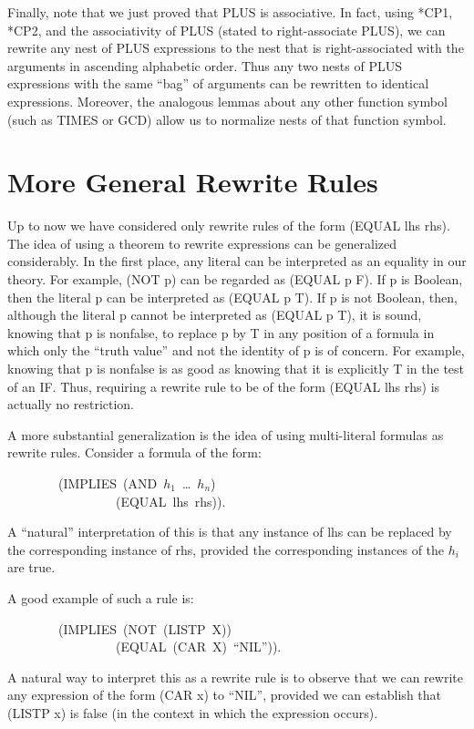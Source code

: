 \documentclass[10pt]{book}
\newenvironment{pubasis}{\begin{flushleft}}{\end{flushleft}}
\begin{document}
Finally, note that we just proved that PLUS is associative.
In fact, using
*CP1, *CP2, and the
associativity of PLUS (stated  to right-associate PLUS), we can rewrite  any nest of PLUS
expressions  to the nest that is right-associated
with the arguments in ascending alphabetic order.  Thus
any two nests of PLUS expressions with the same ``bag'' of arguments
can be rewritten to identical expressions.  Moreover,
the analogous lemmas about any other function symbol
(such as TIMES or GCD) allow us to normalize nests of that function symbol.

\section{More General Rewrite Rules}
Up to now we have  considered only rewrite rules of the form
(EQUAL lhs rhs).  The idea of using a theorem to rewrite expressions can be
generalized considerably.  In the first place, any literal can be
interpreted as an equality in our theory.  For example, (NOT p)
can be regarded as (EQUAL p F).  If p is Boolean, then the literal p
can be interpreted as (EQUAL p T).  If p is not Boolean, then, although
the literal p cannot be interpreted as (EQUAL p T), it is sound, knowing
that p is nonfalse, to replace p by T in any position of a formula in
which only the ``truth value'' and not the identity of p is of concern.
For example, knowing that p is nonfalse is as good as knowing that it is 
explicitly T in the test of an IF.
Thus,
requiring a rewrite rule to be of the form  (EQUAL lhs rhs) is actually no restriction.

A more substantial generalization is the idea of using multi-literal
formulas as rewrite rules.  Consider a formula of the form:

\begin{pubasis}
~~~~~~~~(IMPLIES~(AND~$h_{1}$~\ldots{}~$h_{n}$)\\
~~~~~~~~~~~~~~~~~(EQUAL~lhs~rhs)).\\
\end{pubasis}
A ``natural'' interpretation of this is that any instance of lhs
can be replaced by the corresponding instance of rhs, provided the
corresponding instances of the $h_{i}$ are true.

A good example of such a rule is:
\begin{pubasis}
~~~~~~~~(IMPLIES~(NOT~(LISTP~X))\\
~~~~~~~~~~~~~~~~~(EQUAL~(CAR~X)~``NIL'')).\\
\end{pubasis}
A natural way to interpret this as a rewrite rule is to observe that
we can rewrite any expression of the form (CAR x) to ``NIL'', provided
we can establish that (LISTP x) is false (in the context in which
the expression occurs).
\end{document}
